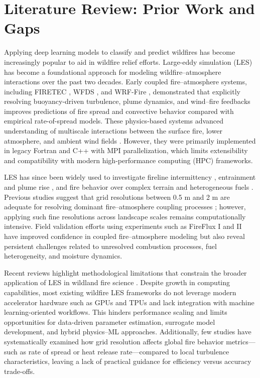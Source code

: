 \documentclass[conference]{IEEEtran}
\begin{document}
\section{Literature Review: Prior Work and Gaps}
Applying deep learning models to classify and predict wildfires has become increasingly popular to aid in wildfire relief efforts. Large-eddy simulation (LES) has become a foundational approach for modeling wildfire--atmosphere interactions over the past two decades. Early coupled fire--atmosphere systems, including FIRETEC \citep{linn2002firetec}, WFDS \citep{mell2009wildland}, and WRF-Fire \citep{coen2013wrf}, demonstrated that explicitly resolving buoyancy-driven turbulence, plume dynamics, and wind--fire feedbacks improves predictions of fire spread and convective behavior compared with empirical rate-of-spread models. These physics-based systems advanced understanding of multiscale interactions between the surface fire, lower atmosphere, and ambient wind fields \citep{sullivan2009wildland,bakhshaii2019review}. However, they were primarily implemented in legacy Fortran and C++ with MPI parallelization, which limits extensibility and compatibility with modern high-performance computing (HPC) frameworks.

LES has since been widely used to investigate fireline intermittency \citep{pimont2021fireline}, entrainment and plume rise \citep{kochanski2013evaluation}, and fire behavior over complex terrain and heterogeneous fuels \citep{mueller2014modeling}. Previous studies suggest that grid resolutions between 0.5 m and 2 m are adequate for resolving dominant fire--atmosphere coupling processes \citep{hiers2020interactions}; however, applying such fine resolutions across landscape scales remains computationally intensive. Field validation efforts using experiments such as FireFlux I and II \citep{clements2007observing,canfield2014fireflux} have improved confidence in coupled fire--atmosphere modeling but also reveal persistent challenges related to unresolved combustion processes, fuel heterogeneity, and moisture dynamics.

Recent reviews highlight methodological limitations that constrain the broader application of LES in wildland fire science \citep{bakhshaii2019review,linn2021conceptual}. Despite growth in computing capabilities, most existing wildfire LES frameworks do not leverage modern accelerator hardware such as GPUs and TPUs and lack integration with machine learning-oriented workflows. This hinders performance scaling and limits opportunities for data-driven parameter estimation, surrogate model development, and hybrid physics--ML approaches. Additionally, few studies have systematically examined how grid resolution affects global fire behavior metrics---such as rate of spread or heat release rate---compared to local turbulence characteristics, leaving a lack of practical guidance for efficiency versus accuracy trade-offs.
\end{document}

